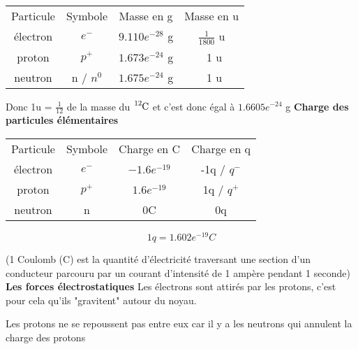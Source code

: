 \documentclass{article}
\begin{document}
\begin{table}[-h]
  \begin{center}
    \begin{tabular}{||c|c|c|c||}
      \hline
      Particule & Symbole   & Masse en g      & Masse en u         \\
      électron  & $e^-$     & $9.110e^{-28}$ g & $\frac{1}{1800}$ u \\
      proton    & $p^+$     & $1.673e^{-24}$ g & ~1 u               \\
      neutron   & n / $n^0$ & $1.675e^{-24}$ g & ~1 u              \\
      \hline
    \end{tabular}
  \end{center}
\end{table}

\newline

Donc 1u = $\frac{1}{12}$ de la masse du $\ce{^{12}C}$ et c'est donc égal à $1.6605e^{-24}$ g
\bigbreak
\textbf{Charge des particules élémentaires}

\begin{table}[-h]
  \begin{center}
    \begin{tabular}{||c|c|c|c||}
      \hline
      Particule & Symbole & Charge en C   & Charge en q \\
      électron  & $e^-$   & $-1.6e^{-19}$ & -1q / $q^-$ \\
      proton    & $p^+$   & $1.6e^{-19}$  & 1q / $q^+$  \\
      neutron   & n       & 0C            & 0q         \\
      \hline
    \end{tabular}
  \end{center}
\end{table}

\begin{equation}
  1q = 1.602e^{-19} C
\end{equation}

(1 Coulomb (C) est la quantité d'électricité traversant une section d'un
conducteur parcouru par un courant d'intensité de 1 ampère pendant 1 seconde)
\bigbreak
\textbf{Les forces électrostatiques}
\bigbreak
Les électrons sont attirés par les protons, c'est pour cela qu'ils "gravitent"
autour du noyau.

Les protons ne se repoussent pas entre eux car il y a les neutrons qui annulent
la charge des protons
\end{document}
